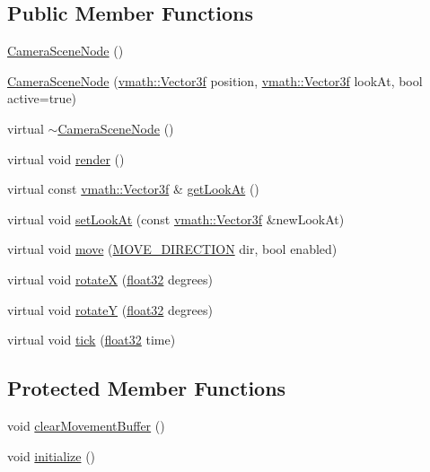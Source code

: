 \subsection*{Public Member Functions}
\begin{DoxyCompactItemize}
\item 
\hyperlink{classicee_1_1engine_1_1CameraSceneNode_a47864782b299cff14008cce8d586aaf0}{CameraSceneNode} ()
\item 
\hyperlink{classicee_1_1engine_1_1CameraSceneNode_a3d44228ffc351233d40f9baeb223c094}{CameraSceneNode} (\hyperlink{classvmath_1_1Vector3f}{vmath::Vector3f} position, \hyperlink{classvmath_1_1Vector3f}{vmath::Vector3f} lookAt, bool active=true)
\item 
virtual \hyperlink{classicee_1_1engine_1_1CameraSceneNode_abd6c6784830e182983ce55b08a37a1ab}{$\sim$CameraSceneNode} ()
\item 
virtual void \hyperlink{classicee_1_1engine_1_1CameraSceneNode_a230b6af4d2c61341e7146e901c25e8be}{render} ()
\item 
virtual const \hyperlink{classvmath_1_1Vector3f}{vmath::Vector3f} \& \hyperlink{classicee_1_1engine_1_1CameraSceneNode_ae6e8b374b9e726d97fe693014fca1c81}{getLookAt} ()
\item 
virtual void \hyperlink{classicee_1_1engine_1_1CameraSceneNode_a8c0d4458f9587dd4aade5e60ddeeafbe}{setLookAt} (const \hyperlink{classvmath_1_1Vector3f}{vmath::Vector3f} \&newLookAt)
\item 
virtual void \hyperlink{classicee_1_1engine_1_1CameraSceneNode_ac5d5e2204f5448375c9e830eb67e5cea}{move} (\hyperlink{classicee_1_1engine_1_1ICameraSceneNode_a47efe47a91708ebed42249f6304309ae}{MOVE\_\-DIRECTION} dir, bool enabled)
\item 
virtual void \hyperlink{classicee_1_1engine_1_1CameraSceneNode_a0f69fecc9d1153eb15fc1118a6efa28d}{rotateX} (\hyperlink{namespacecompatibility_a32a2d006ac2172c0f859370287f0104c}{float32} degrees)
\item 
virtual void \hyperlink{classicee_1_1engine_1_1CameraSceneNode_a5f2142852ab5aea21af731097a9ce9bf}{rotateY} (\hyperlink{namespacecompatibility_a32a2d006ac2172c0f859370287f0104c}{float32} degrees)
\item 
virtual void \hyperlink{classicee_1_1engine_1_1CameraSceneNode_a267404d1f0eba71120ffc7c9950bfbd4}{tick} (\hyperlink{namespacecompatibility_a32a2d006ac2172c0f859370287f0104c}{float32} time)
\end{DoxyCompactItemize}
\subsection*{Protected Member Functions}
\begin{DoxyCompactItemize}
\item 
void \hyperlink{classicee_1_1engine_1_1CameraSceneNode_ad57a1c47b456258354be6f53228fe936}{clearMovementBuffer} ()
\item 
void \hyperlink{classicee_1_1engine_1_1CameraSceneNode_a1862166f71fa916a43301842b3ca0880}{initialize} ()
\end{DoxyCompactItemize}
